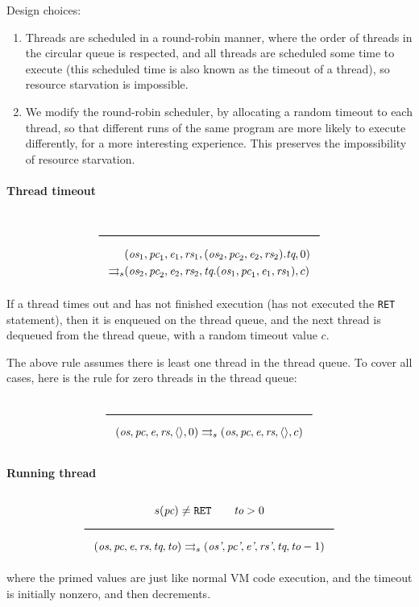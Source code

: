 Design choices:
\begin{enumerate}
\item Threads are scheduled in a round-robin manner, where the order of threads in the circular queue is respected, and all threads are scheduled some time to execute (this scheduled time is also known as the timeout of a thread), so resource starvation is impossible.
\item We modify the round-robin scheduler, by allocating a random timeout to each thread, so that different runs of the same program are more likely to execute differently, for a more interesting experience. This preserves the impossibility of resource starvation.
\end{enumerate}

\paragraph{Thread timeout}
\label{sec:org760382b}
$$\Rule{}{
\begin{aligned}
&(\textit{os}_1, \textit{pc}_1, \textit{e}_1, \textit{rs}_1, (\textit{os}_2, \textit{pc}_2, \textit{e}_2, \textit{rs}_2).\textit{tq}, 0)\\
\transition &(\textit{os}_2, \textit{pc}_2, \textit{e}_2, \textit{rs}_2, \textit{tq}.(\textit{os}_1, \textit{pc}_1, \textit{e}_1, \textit{rs}_1), c)
\end{aligned}}$$
If a thread times out and has not finished execution (has not executed the \texttt{RET} statement), then it is enqueued on the thread queue, and the next thread is dequeued from the thread queue, with a random timeout value \(c\).

The above rule assumes there is least one thread in the thread queue. To cover all cases, here is the rule for zero threads in the thread queue:
$$\Rule{}{(\textit{os}, \textit{pc}, \textit{e}, \textit{rs}, \langle \rangle, 0) \transition (\textit{os}, \textit{pc}, \textit{e}, \textit{rs}, \langle \rangle, c)}$$

\paragraph{Running thread}
\label{sec:org0f4af5f}
$$\Rule{s(\textit{pc}) \neq \texttt{RET} \qquad \textit{to} > 0}{(\textit{os}, \textit{pc}, \textit{e}, \textit{rs}, \textit{tq}, \textit{to}) \transition (\textit{os'}, \textit{pc'}, \textit{e'}, \textit{rs'}, \textit{tq}, \textit{to}-1)}$$
where the primed values are just like normal VM code execution, and the timeout is initially nonzero, and then decrements.

